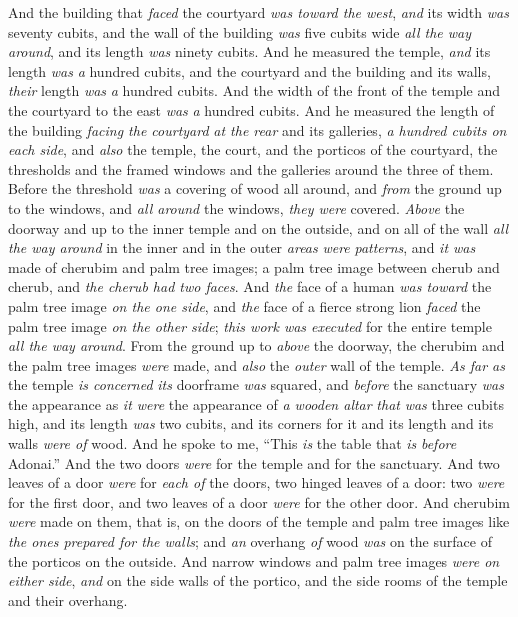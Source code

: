 \begin{biblechapter}
\verse And the building that \textit{faced} the courtyard \textit{was toward the west}, \textit{and} its width \textit{was} seventy cubits, and the wall of the building \textit{was} five cubits wide \textit{all the way around}, and its length \textit{was} ninety cubits.
\verse And he measured the temple, \textit{and} its length \textit{was} \textit{a} hundred cubits, and the courtyard and the building and its walls, \textit{their} length \textit{was} \textit{a} hundred cubits.
\verse And the width of the front of the temple and the courtyard to the east \textit{was} \textit{a} hundred cubits.
\verse And he measured the length of the building \textit{facing the courtyard} \textit{at the rear} and its galleries, \textit{a hundred cubits on each side}, and \textit{also} the temple, the court, and the porticos of the courtyard,
\verse the thresholds and the framed windows and the galleries around the three of them. Before the threshold \textit{was} a covering of wood all around, and \textit{from} the ground up to the windows, and \textit{all around} the windows, \textit{they were} covered.
\verse \textit{Above} the doorway and up to the inner temple and on the outside, and on all of the wall \textit{all the way around} in the inner and in the outer \textit{areas} \textit{were} \textit{patterns},
\verse and \textit{it was} made of cherubim and palm tree images; a palm tree image between cherub and cherub, and \textit{the cherub had two faces}.
\verse And \textit{the} face of a human \textit{was toward} the palm tree image \textit{on the one side}, and \textit{the} face of a fierce strong lion \textit{faced} the palm tree image \textit{on the other side}; \textit{this work was executed} for the entire temple \textit{all the way around}.
\verse From the ground up to \textit{above} the doorway, the cherubim and the palm tree images \textit{were} made, and \textit{also} the \textit{outer} wall of the temple.
\verse \textit{As far as} the temple \textit{is concerned} \textit{its} doorframe \textit{was} squared, and \textit{before} the sanctuary \textit{was} the appearance as \textit{it were} the appearance of
\verse \textit{a wooden altar} \textit{that} \textit{was} three cubits high, and its length \textit{was} two cubits, and its corners for it and its length and its walls \textit{were of} wood. And he spoke to me, “This \textit{is} the table that \textit{is} \textit{before} Adonai.”
\verse And the two doors \textit{were} for the temple and for the sanctuary.
\verse And two leaves of a door \textit{were} for \textit{each of} the doors, two hinged leaves of a door: two \textit{were} for the first door, and two leaves of a door \textit{were} for the other door.
\verse And cherubim \textit{were} made on them, that is, on the doors of the temple and palm tree images like \textit{the ones prepared for the walls}; and \textit{an} overhang \textit{of} wood \textit{was} on the surface of the porticos on the outside.
\verse And narrow windows and palm tree images \textit{were on either side}, \textit{and} on the side walls of the portico, and the side rooms of the temple and their overhang.
\end{biblechapter}

